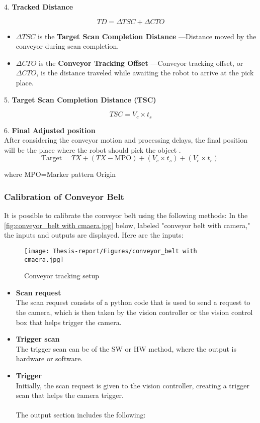 \documentclass[12pt]{article}
\begin{document}
4. \textbf{Tracked Distance} 

\[
TD = \Delta TSC + \Delta CTO 
\]

\begin{itemize}
  \item $\Delta TSC$ is the \textbf{Target Scan Completion Distance}%
        —Distance moved by the conveyor during scan completion\cite{ref21}.
  \item $\Delta CTO$ is the \textbf{Conveyor Tracking Offset}%
        —Conveyor tracking offset, or $\Delta CTO$, is the distance traveled while awaiting the robot to arrive at the pick place\cite{ref21}.
\end{itemize}

5. \textbf{Target Scan Completion Distance (TSC)} 

\begin{center}
    \[
    TSC = V_c \times t_s 
    \]
\end{center}

6. \textbf{Final Adjusted position}\\

After considering the conveyor motion and processing delays, the final position will be the place where the robot should pick the object \cite{ref21}.\\

\[
\text{Target} = TX + (TX - \text{MPO}) + (V_c \times t_s) + (V_c \times t_r)\
\]

where MPO=Marker pattern Origin
\subsubsection{Calibration of Conveyor Belt}
It is possible to calibrate the conveyor belt using the following methods:   In the \autoref{fig:conveyor_belt with cmaera.jpg} below, labeled "conveyor belt with camera," the inputs and outputs are displayed.  Here are the inputs:

\begin{figure}[h]
    \centering
    \texttt{[image: Thesis-report/Figures/conveyor\_belt with cmaera.jpg]} 
    \caption{Conveyor tracking setup}
    \label{fig:conveyor_belt with cmaera.jpg}
\end{figure}

\begin{itemize}
\item \textbf{Scan request}\\
The scan request consists of a  python code that is used to send a request to the camera, which is then taken by the vision controller or the vision control box that helps trigger the camera.
 \item \textbf{Trigger scan}\\
 The trigger scan can be of the SW or HW method, where the output is hardware or software.

\item \textbf{Trigger }\\
Initially, the scan request is given to the vision controller, creating a trigger scan that helps the camera trigger.\\\\
The output section includes the following:
\end{itemize}
\end{document}
